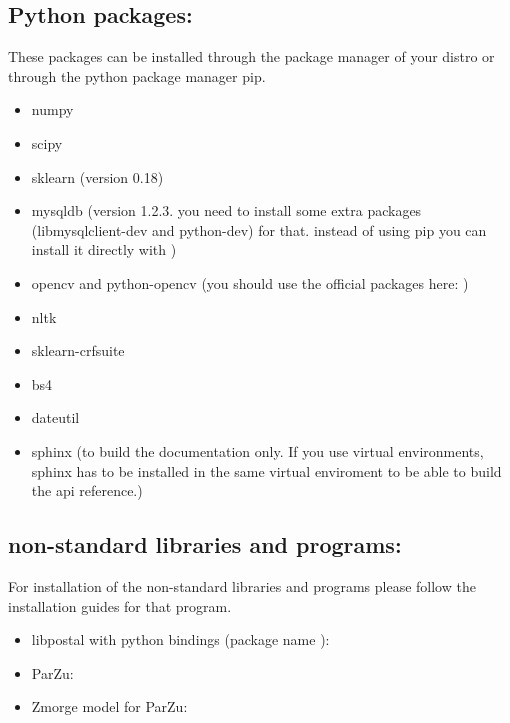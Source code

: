 \documentclass[letterpaper,10pt,english]{sphinxmanual}
\begin{document}
\subsection{Python packages:}
\label{\detokenize{installation:python-packages}}
These packages can be installed through the package manager of your
distro or through the python package manager pip.
\begin{itemize}
\item {} 
numpy

\item {} 
scipy

\item {} 
sklearn (version 0.18)

\item {} 
mysqldb (version 1.2.3. you need to install some extra packages
(libmysqlclient-dev and python-dev) for that. instead of using pip
you can install it directly with )

\item {} 
opencv and python-opencv (you should use the official packages here:
)

\item {} 
nltk

\item {} 
sklearn-crfsuite

\item {} 
bs4

\item {} 
dateutil

\item {} 
sphinx (to build the documentation only. If you use virtual
environments, sphinx has to be installed in the same virtual
enviroment to be able to build the api reference.)

\end{itemize}


\subsection{non-standard libraries and programs:}
\label{\detokenize{installation:non-standard-libraries-and-programs}}
For installation of the non-standard libraries and programs please
follow the installation guides for that program.
\begin{itemize}
\item {} 
libpostal with python bindings (package name ):

\item {} 
ParZu: 

\item {} 
Zmorge model for ParZu: 

\end{itemize}
\end{document}
